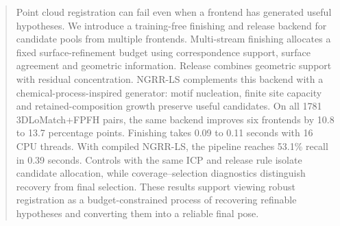 \begin{abstract}
Point cloud registration can fail even when a frontend has generated useful hypotheses. We introduce a training-free finishing and release backend for candidate pools from multiple frontends. Multi-stream finishing allocates a fixed surface-refinement budget using correspondence support, surface agreement and geometric information. Release combines geometric support with residual concentration. NGRR-LS complements this backend with a chemical-process-inspired generator: motif nucleation, finite site capacity and retained-composition growth preserve useful candidates. On all 1781 3DLoMatch+FPFH pairs, the same backend improves six frontends by 10.8 to 13.7 percentage points. Finishing takes 0.09 to 0.11 seconds with 16 CPU threads. With compiled NGRR-LS, the pipeline reaches 53.1\% recall in 0.39 seconds. Controls with the same ICP and release rule isolate candidate allocation, while coverage--selection diagnostics distinguish recovery from final selection. These results support viewing robust registration as a budget-constrained process of recovering refinable hypotheses and converting them into a reliable final pose.
\end{abstract}
